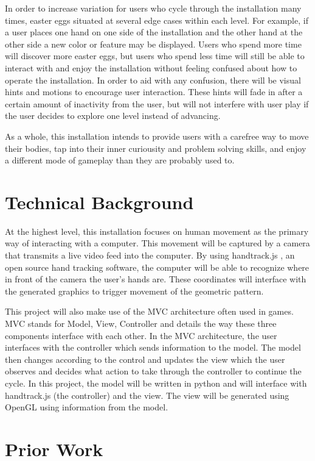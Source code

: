 \documentclass[10pt,twocolumn]{article}
\begin{document}
In order to increase variation for users who cycle through the installation many times, easter eggs situated at several edge cases within each level.  For example, if a user places one hand on one side of the installation and the other hand at the other side a new color or feature may be displayed.  Users who spend more time will discover more easter eggs, but users who spend less time will still be able to interact with and enjoy the installation without feeling confused about how to operate the installation.  In order to aid with any confusion, there will be visual hints and motions to encourage user interaction. These hints will fade in after a certain amount of inactivity from the user, but will not interfere with user play if the user decides to explore one level instead of advancing. 

As a whole, this installation intends to provide users with a carefree way to move their bodies, tap into their inner curiousity and problem solving skills, and enjoy a different mode of gameplay than they are probably used to. 


\section{Technical Background}

At the highest level, this installation focuses on human movement as the primary way of interacting with a computer.  This movement will be captured by a camera that transmits a live video feed into the computer.  By using handtrack.js \cite{handTrack.js_Dibia2017}, an open source hand tracking software, the computer will be able to recognize where in front of the camera the user's hands are.  These coordinates will interface with the generated graphics to trigger movement of the geometric pattern.  

This project will also make use of the MVC architecture often used in games.  MVC stands for Model, View, Controller and details the way these three components interface with each other. In the MVC architecture, the user interfaces with the controller which sends information to the model.  The model then changes according to the control and updates the view which the user observes and decides what action to take through the controller to continue the cycle. In this project, the model will be written in python and will interface with handtrack.js (the controller) and the view.  The view will be generated using OpenGL using information from the model.  


\section{Prior Work}
\end{document}
